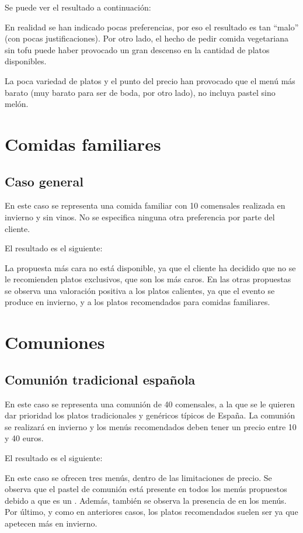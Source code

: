 Se puede ver el resultado a continuación:


En realidad se han indicado pocas preferencias, por eso el resultado es tan
``malo'' (con pocas justificaciones). Por otro lado, el hecho de pedir comida
vegetariana sin tofu puede haber provocado un gran descenso en la cantidad de
platos disponibles.

La poca variedad de platos y el punto del precio han provocado que el menú más
barato (muy barato para ser de boda, por otro lado), no incluya pastel sino
melón.

\section{Comidas familiares}
\subsection{Caso general}
En este caso se representa una comida familiar con 10 comensales realizada en invierno y sin vinos. No se especifica ninguna otra
preferencia por parte del cliente.

El resultado es el siguiente:


La propuesta más cara no está disponible, ya que el cliente ha decidido que no se le recomienden platos exclusivos, que son los más
caros. En las otras propuestas se observa una valoración positiva a los platos calientes, ya que el evento se produce en invierno,
y a los platos recomendados para comidas familiares.

\section{Comuniones}
\subsection{Comunión tradicional española}
En este caso se representa una comunión de 40 comensales, a la que se le quieren dar prioridad los platos tradicionales y genéricos
típicos de España. La comunión se realizará en invierno y los menús recomendados deben tener un precio entre 10 y 40 euros.

El resultado es el siguiente:


En este caso se ofrecen tres menús, dentro de las limitaciones de precio. Se observa que el pastel de comunión está presente en
todos los menús propuestos debido a que es un . Además, también se observa la presencia de
 en  los menús. Por último, y como en anteriores casos, los platos
recomendados suelen ser  ya que apetecen más en invierno.
